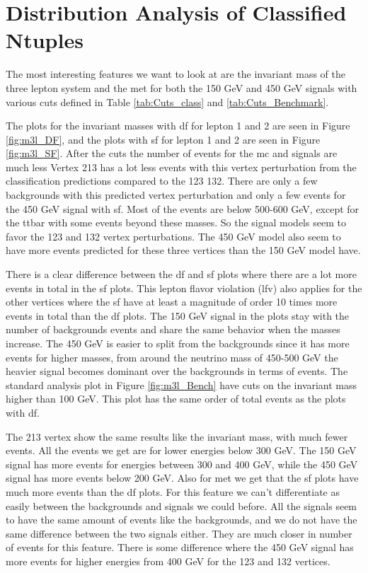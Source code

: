 \documentclass[a4paper, american, 12pt]{report}
\begin{document}
	
	
	\chapter{Distribution Analysis of Classified Ntuples}
	\label{chap:Result-VarDist}
	The most interesting features we want to look at are the invariant mass of the three lepton system and the \acrshort{met} for both the 150 GeV and 450 GeV signals with various cuts defined in Table \ref{tab:Cuts_class} and \ref{tab:Cuts_Benchmark}. 
	
	The plots for the invariant masses with \acrshort{df} for lepton 1 and 2 are seen in Figure \ref{fig:m3l_DF}, and the plots with \acrshort{sf} for lepton 1 and 2 are seen in Figure \ref{fig:m3l_SF}. After the cuts the number of events for the \acrshort{mc} and signals are much less Vertex 213 has a lot less events with this vertex perturbation from the classification predictions compared to the 123 132. There are only a few backgrounds with this predicted vertex perturbation and only a few events for the 450 GeV signal with \acrshort{sf}. Most of the events are below 500-600 GeV, except for the ttbar with some events beyond these masses. So the signal models seem to favor the 123 and 132 vertex perturbations. The 450 GeV model also seem to have more events predicted for these three vertices than the 150 GeV model have. 
	
	There is a clear difference between the \acrshort{df} and \acrshort{sf} plots where there are a lot more events in total in the \acrshort{sf} plots. This lepton flavor violation (\acrshort{lfv}) also applies for the other vertices where the \acrshort{sf} have at least a magnitude of order 10 times more events in total than the \acrshort{df} plots. The 150 GeV signal in the plots stay with the number of backgrounds events and share the same behavior when the masses increase. The 450 GeV is easier to split from the backgrounds since it has more events for higher masses, from around the neutrino mass of 450-500 GeV the heavier signal becomes dominant over the backgrounds in terms of events. The standard analysis plot in Figure \ref{fig:m3l_Bench} have cuts on the invariant mass higher than 100 GeV. This plot has the same order of total events as the plots with \acrshort{df}.

	The 213 vertex show the same results like the invariant mass, with much fewer events. All the events we get are for lower energies below 300 GeV. The 150 GeV signal has more events for energies between 300 and 400 GeV, while the 450 GeV signal has more events below 200 GeV. Also for \acrshort{met} we get that the \acrshort{sf} plots have much more events than the \acrshort{df} plots. For this feature we can't differentiate as easily between the backgrounds and signals we could before. All the signals seem to have the same amount of events like the backgrounds, and we do not have the same difference between the two signals either. They are much closer in number of events for this feature. There is some difference where the 450 GeV signal has more events for higher energies from 400 GeV for the 123 and 132 vertices.
	
\end{document}
